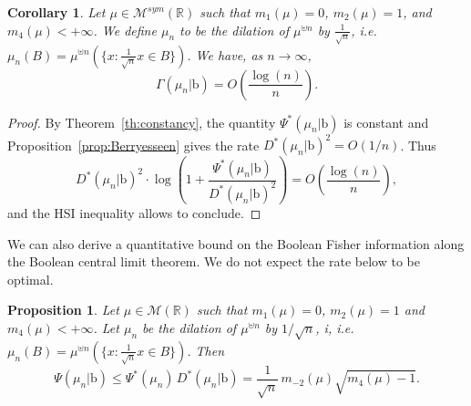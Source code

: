 \documentclass[10pt, reqno]{amsart}
\numberwithin{equation}{section}
\theoremstyle{definition}
\theoremstyle{plain}
\newtheorem{proposition}[definition]{Proposition}
\newtheorem{corollary}[definition]{Corollary}
\theoremstyle{remark}
\newcommand{\1}{\mathbbm{1}}
\begin{document}
\begin{corollary}
      Let $\mu\in \mathcal{M}^{sym}(\mathbb{R})$ such that $m_1(\mu) = 0$, $m_2(\mu) = 1$,
and $m_4(\mu) < +\infty$.  We define $\mu_n$ to be the dilation of $\mu^{\uplus n}$ by $\frac{1}{\sqrt{n}}$, i.e. $\mu_n(B)=\mu^{\uplus n}(\{x:\frac{1}{\sqrt{n}}x\in B\})$. We have, as $n\to \infty$,
    $$\Gamma(\mu_n|\mathbb{\mathrm{b}})=O\left(\frac{\log(n)}{n}\right).$$
\end{corollary}
\begin{proof}By Theorem~\ref{th:constancy}, the quantity $\Psi^*(\mu_n|\mathbb{\mathrm{b}})$ is constant and Proposition~\ref{prop:Berryesseen} gives the rate $D^*(\mu_n|\mathbb{\mathrm{b}})^2=O(1/n)$. Thus
$$D^*(\mu_n|\mathbb{\mathrm{b}})^2\cdot \log\left(1+\frac{\Psi^*(\mu_n|\mathbb{\mathrm{b}})}{D^*(\mu_n|\mathbb{\mathrm{b}})^2}\right)=O\left(\frac{\log(n)}{n}\right),$$
and the HSI inequality allows to conclude.
\end{proof}
We can also derive a quantitative bound on the Boolean Fisher information along the Boolean central limit theorem. We do not expect the rate below to be optimal.

\begin{proposition}
Let $\mu\in \mathcal{M}(\mathbb{R})$ such that $m_1(\mu)=0$, $m_2(\mu)=1$ and $m_4(\mu)<+\infty$.  
Let $\mu_n$ be the dilation of $\mu^{\uplus n}$ by $1/\sqrt{n}$, i, i.e. $\mu_n(B)=\mu^{\uplus n}(\{x:\frac{1}{\sqrt{n}}x\in B\})$.
Then
\[
\Psi(\mu_n|\mathbb{\mathrm b})
\le \Psi^*(\mu_n)\,D^*(\mu_n|\mathbb{\mathrm b})
=\frac{1}{\sqrt n}\,m_{-2}(\mu)\sqrt{m_4(\mu)-1}.
\]
\end{proposition}
\end{document}
